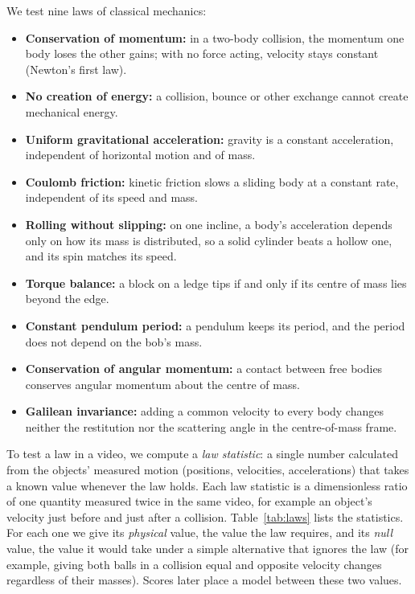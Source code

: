 \documentclass[10pt]{article}
\begin{document}
We test nine laws of classical mechanics:
\begin{itemize}
\item \textbf{Conservation of momentum:} in a two-body collision, the momentum one body loses the other gains; with
no force acting, velocity stays constant (Newton's first law).
\item \textbf{No creation of energy:} a collision, bounce or other exchange cannot create mechanical energy.
\item \textbf{Uniform gravitational acceleration:} gravity is a constant acceleration, independent of horizontal
motion and of mass.
\item \textbf{Coulomb friction:} kinetic friction slows a sliding body at a constant rate, independent of its speed and
mass.
\item \textbf{Rolling without slipping:} on one incline, a body's acceleration depends only on how its mass is
distributed, so a solid cylinder beats a hollow one, and its spin matches its speed.
\item \textbf{Torque balance:} a block on a ledge tips if and only if its centre of mass lies beyond the edge.
\item \textbf{Constant pendulum period:} a pendulum keeps its period, and the period does not depend on the bob's mass.
\item \textbf{Conservation of angular momentum:} a contact between free bodies conserves angular momentum about the
centre of mass.
\item \textbf{Galilean invariance:} adding a common velocity to every body changes neither the restitution nor the
scattering angle in the centre-of-mass frame.
\end{itemize}
To test a law in a video, we compute a \emph{law statistic}: a single number calculated from the objects' measured
motion (positions, velocities, accelerations) that takes a known value whenever the law holds. Each law statistic is a
dimensionless ratio of one quantity measured twice in the same video, for example an object's velocity just before and
just after a collision. Table~\ref{tab:laws} lists the statistics. For each one we give its \emph{physical} value,
the value the law requires, and its \emph{null} value, the value it would take under a simple alternative that ignores
the law (for example, giving both balls in a collision equal and opposite velocity changes regardless of their masses). Scores later place a model between
these two values.
\end{document}
